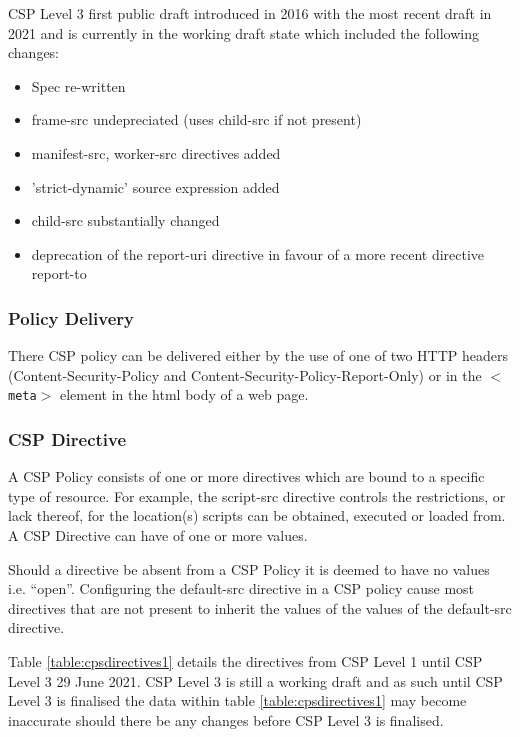 \documentclass{mscreport}
\begin{document}
\vspace{0.3cm} \noindent
CSP Level 3 first public draft introduced in 2016 \cite{West2016-xj} with the most recent draft in 2021 \cite{West2021-hi} and is currently in the working draft state which included the following changes:
\begin{itemize}
	\setlength\itemsep{0.1em}
	\item Spec re-written
	\item frame-src undepreciated (uses child-src if not present)
	\item manifest-src, worker-src directives added
	\item 'strict-dynamic' source expression added
	\item child-src substantially changed
	\item deprecation of the report-uri directive in favour of a more recent directive report-to
\end{itemize}


\subsubsection{Policy Delivery}
There CSP policy can be delivered either by the use of one of two HTTP headers (Content-Security-Policy and Content-Security-Policy-Report-Only) or in the \texttt{$<$meta$>$} element in the html body of a web page.

\subsubsection{CSP Directive}
A CSP Policy consists of one or more directives which are bound to a specific type of resource. For example, the script-src directive controls the restrictions, or lack thereof, for the location(s) scripts can be obtained, executed or loaded from. A CSP Directive can have of one or more values.

\vspace{0.3cm} \noindent
Should a directive be absent from a CSP Policy it is deemed to have no values i.e. ``open''. Configuring the default-src directive in a CSP policy cause most directives that are not present to inherit the values of the values of the default-src directive.

\vspace{0.3cm} \noindent
Table \ref{table:cpsdirectives1} details the directives from CSP Level 1 until CSP Level 3 29 June 2021. CSP Level 3 is still a working draft and as such until CSP Level 3 is finalised the data within table \ref{table:cpsdirectives1} may become inaccurate should there be any changes before CSP Level 3 is finalised.
\end{document}
